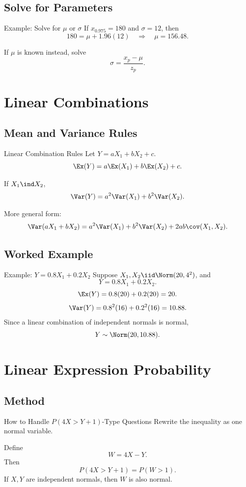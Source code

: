 \documentclass[aspectratio=169]{beamer}
\begin{document}
\subsection{Solve for Parameters}
\begin{frame}{Example: Solve for \(\mu\) or \(\sigma\)}
  If \(x_{0.975}=180\) and \(\sigma=12\), then
  \[
    180=\mu+1.96(12)
    \quad\Longrightarrow\quad
    \mu=156.48.
  \]

  If \(\mu\) is known instead, solve
  \[
    \sigma=\frac{x_p-\mu}{z_p}.
  \]
\end{frame}

\section{Linear Combinations}

\subsection{Mean and Variance Rules}
\begin{frame}{Linear Combination Rules}
  Let \(Y=aX_1+bX_2+c\).
  \[
    \Ex(Y)=a\Ex(X_1)+b\Ex(X_2)+c.
  \]

  If \(X_1\ind X_2\),
  \[
    \Var(Y)=a^2\Var(X_1)+b^2\Var(X_2).
  \]

  More general form:
  \[
    \Var(aX_1+bX_2)=a^2\Var(X_1)+b^2\Var(X_2)+2ab\cov(X_1,X_2).
  \]
\end{frame}

\subsection{Worked Example}
\begin{frame}{Example: \(Y=0.8X_1+0.2X_2\)}
  Suppose \(X_1,X_2\iid\Norm(20,4^2)\), and
  \[
    Y=0.8X_1+0.2X_2.
  \]
  \[
    \Ex(Y)=0.8(20)+0.2(20)=20.
  \]
  \[
    \Var(Y)=0.8^2(16)+0.2^2(16)=10.88.
  \]
  Since a linear combination of independent normals is normal,
  \[
    Y\sim\Norm(20,10.88).
  \]
\end{frame}

\section{Linear Expression Probability}

\subsection{Method}
\begin{frame}{How to Handle \(P(4X>Y+1)\)-Type Questions}
  Rewrite the inequality as one normal variable.

  Define
  \[
    W=4X-Y.
  \]
  Then
  \[
    P(4X>Y+1)=P(W>1).
  \]
  If \(X,Y\) are independent normals, then \(W\) is also normal.
\end{frame}
\end{document}
